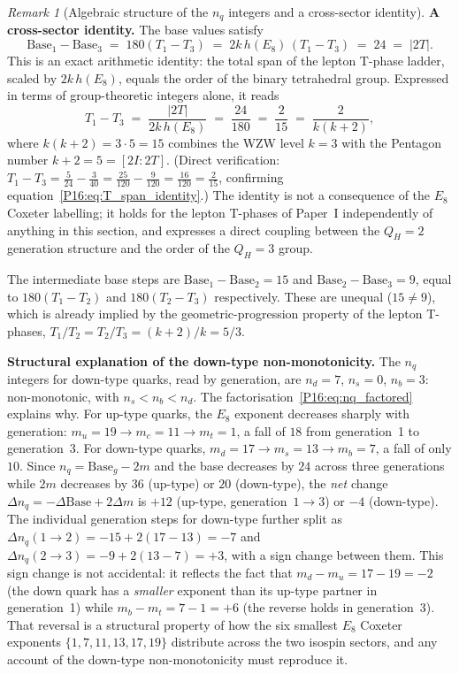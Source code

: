 \documentclass[11pt,a4paper]{article}
\theoremstyle{definition}\newtheorem{definition}[theorem]{Definition}
\theoremstyle{remark}
\newtheorem{remark}[theorem]{Remark}
\theoremstyle{definition}\newtheorem{construction}[theorem]{Construction}
\newcommand{\twoI}{2I}
\newcommand{\twoT}{2T}
\newcommand{\QH}{Q_H}
\begin{document}
\begin{remark}[Algebraic structure of the $n_q$ integers and a cross-sector identity]
\textbf{A cross-sector identity.}
The base values satisfy
\begin{equation}
  \mathrm{Base}_1 - \mathrm{Base}_3
  \;=\; 180(T_1 - T_3)
  \;=\; 2k\,h(E_8)\,(T_1 - T_3)
  \;=\; 24
  \;=\; |\twoT|.
  \label{P16:eq:nq_base_identity}
\end{equation}
This is an exact arithmetic identity: the total span of the lepton
T-phase ladder, scaled by $2k\,h(E_8)$, equals the order of the
binary tetrahedral group.  Expressed in terms of group-theoretic
integers alone, it reads
\begin{equation}
  T_1 - T_3
  \;=\; \frac{|\twoT|}{2k\,h(E_8)}
  \;=\; \frac{24}{180}
  \;=\; \frac{2}{15}
  \;=\; \frac{2}{k(k+2)},
  \label{P16:eq:T_span_identity}
\end{equation}
where $k(k+2) = 3\cdot5 = 15$ combines the WZW level $k=3$ with the
Pentagon number $k+2=5=[\twoI:\twoT]$.  (Direct verification:
$T_1 - T_3 = \tfrac{5}{24} - \tfrac{3}{40} = \tfrac{25}{120} -
\tfrac{9}{120} = \tfrac{16}{120} = \tfrac{2}{15}$, confirming
equation~\eqref{P16:eq:T_span_identity}.)
The identity is not a consequence of the $E_8$ Coxeter labelling; it
holds for the lepton T-phases of Paper~I independently of anything in
this section, and expresses a direct coupling between the
$\QH=2$ generation structure and the order of the $\QH=3$
group.

The intermediate base steps are $\mathrm{Base}_1 - \mathrm{Base}_2 = 15$ and
$\mathrm{Base}_2 - \mathrm{Base}_3 = 9$, equal to $180(T_1-T_2)$ and
$180(T_2-T_3)$ respectively.  These are unequal ($15 \neq 9$), which is
already implied by the geometric-progression property of the lepton
T-phases, $T_1/T_2 = T_2/T_3 = (k+2)/k = 5/3$.

\textbf{Structural explanation of the down-type non-monotonicity.}
The $n_q$ integers for down-type quarks, read by generation, are
$n_d=7$, $n_s=0$, $n_b=3$: non-monotonic, with $n_s<n_b<n_d$.
The factorisation~\eqref{P16:eq:nq_factored} explains why.  For up-type
quarks, the $E_8$ exponent decreases sharply with generation:
$m_u=19\to m_c=11\to m_t=1$, a fall of $18$ from generation~1 to
generation~3.  For down-type quarks, $m_d=17\to m_s=13\to m_b=7$,
a fall of only $10$.  Since $n_q = \mathrm{Base}_g - 2m$ and the base
decreases by $24$ across three generations while $2m$ decreases by
$36$ (up-type) or $20$ (down-type), the \emph{net} change
$\Delta n_q = -\Delta\mathrm{Base} + 2\Delta m$ is $+12$ (up-type,
generation~$1\to3$) or $-4$ (down-type).  The individual generation
steps for down-type further split as
$\Delta n_q(1\to2) = -15 + 2(17-13) = -7$ and
$\Delta n_q(2\to3) = -9 + 2(13-7) = +3$, with a sign change between
them.  This sign change is not accidental: it reflects the fact that
$m_d - m_u = 17-19 = -2$ (the down quark has a \emph{smaller}
exponent than its up-type partner in generation~1) while
$m_b - m_t = 7-1 = +6$ (the reverse holds in generation~3).  That
reversal is a structural property of how the six smallest $E_8$
Coxeter exponents $\{1,7,11,13,17,19\}$ distribute across the two
isospin sectors, and any account of the down-type non-monotonicity
must reproduce it.


\end{remark}
\end{document}
